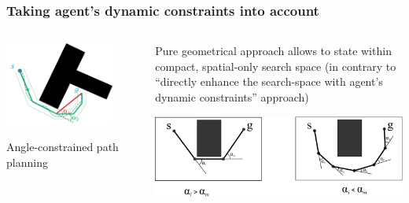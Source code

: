 \documentclass[default]{beamer}
\begin{document}
	\begin{frame}
		\frametitle{Taking agent’s dynamic constraints into account}
		
		\begin{columns}
			\begin{column}{0.45\textwidth}
				\includegraphics[width=0.8\textwidth]{strl/angl_constr_planning.png}
				\par\bigskip
				Angle-constrained path planning
			\end{column}
			\begin{column}{0.55\textwidth}
				Pure geometrical approach allows to state within compact, spatial-only search space (in contrary to “directly enhance the search-space with agent’s dynamic constraints” approach)
				\par\bigskip
				\includegraphics[width=\textwidth]{strl/path_lian.png}
			\end{column}
		\end{columns}
	\end{frame}
\end{document}
